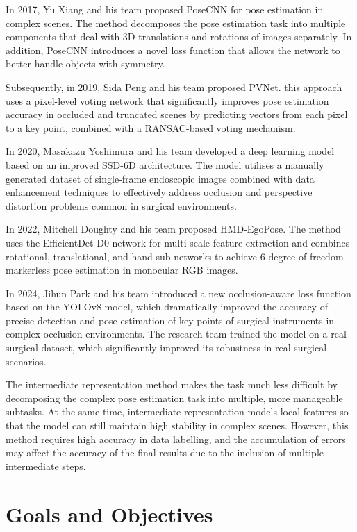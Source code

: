 \documentclass[12pt]{article}
\begin{document}
In 2017, Yu Xiang and his team proposed PoseCNN for pose estimation in complex scenes. The method decomposes the pose estimation task into multiple components that deal with 3D translations and rotations of images separately. In addition, PoseCNN introduces a novel loss function that allows the network to better handle objects with symmetry\cite{xiang2017posecnn}.

Subsequently, in 2019, Sida Peng and his team proposed PVNet\cite{peng2019pvnet}. this approach uses a pixel-level voting network that significantly improves pose estimation accuracy in occluded and truncated scenes by predicting vectors from each pixel to a key point, combined with a RANSAC-based voting mechanism.

In 2020, Masakazu Yoshimura and his team developed a deep learning model based on an improved SSD-6D architecture\cite{yoshimura2020single}. The model utilises a manually generated dataset of single-frame endoscopic images combined with data enhancement techniques to effectively address occlusion and perspective distortion problems common in surgical environments.

In 2022, Mitchell Doughty and his team proposed HMD-EgoPose\cite{yoshimura2020single}. The method uses the EfficientDet-D0 network for multi-scale feature extraction and combines rotational, translational, and hand sub-networks to achieve 6-degree-of-freedom markerless pose estimation in monocular RGB images.

In 2024, Jihun Park and his team introduced a new occlusion-aware loss function based on the YOLOv8 model, which dramatically improved the accuracy of precise detection and pose estimation of key points of surgical instruments in complex occlusion environments\cite{park2024towards}. The research team trained the model on a real surgical dataset, which significantly improved its robustness in real surgical scenarios.

The intermediate representation method makes the task much less difficult by decomposing the complex pose estimation task into multiple, more manageable subtasks. At the same time, intermediate representation models local features so that the model can still maintain high stability in complex scenes. However, this method requires high accuracy in data labelling, and the accumulation of errors may affect the accuracy of the final results due to the inclusion of multiple intermediate steps\cite{xu2023graph}\cite{allan20183}.


\section{Goals and Objectives}
\end{document}
